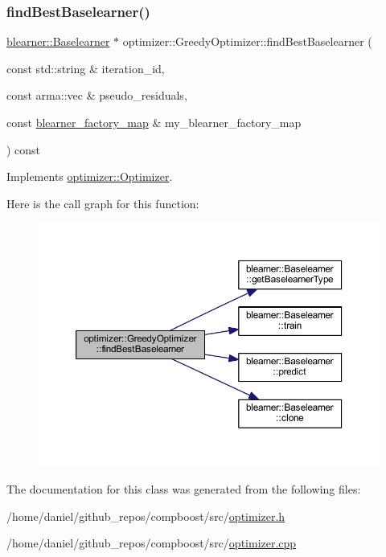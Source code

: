 \subsubsection{\texorpdfstring{find\+Best\+Baselearner()}{findBestBaselearner()}}
{\footnotesize\ttfamily \hyperlink{classblearner_1_1_baselearner}{blearner\+::\+Baselearner} $\ast$ optimizer\+::\+Greedy\+Optimizer\+::find\+Best\+Baselearner (\begin{DoxyParamCaption}\item[{const std\+::string \&}]{iteration\+\_\+id,  }\item[{const arma\+::vec \&}]{pseudo\+\_\+residuals,  }\item[{const \hyperlink{baselearner__factory__list_8h_a058570e00ae11b882cfed36eb40be025}{blearner\+\_\+factory\+\_\+map} \&}]{my\+\_\+blearner\+\_\+factory\+\_\+map }\end{DoxyParamCaption}) const\hspace{0.3cm}{\ttfamily [virtual]}}



Implements \hyperlink{classoptimizer_1_1_optimizer_a134c7b34ed868231fbab53e9ebfa8fd8}{optimizer\+::\+Optimizer}.

Here is the call graph for this function\+:\nopagebreak
\begin{figure}[H]
\begin{center}
\leavevmode
\includegraphics[width=350pt]{classoptimizer_1_1_greedy_optimizer_adc36d8a0082dc065fc1340869d36069d_cgraph}
\end{center}
\end{figure}


The documentation for this class was generated from the following files\+:\begin{DoxyCompactItemize}
\item 
/home/daniel/github\+\_\+repos/compboost/src/\hyperlink{optimizer_8h}{optimizer.\+h}\item 
/home/daniel/github\+\_\+repos/compboost/src/\hyperlink{optimizer_8cpp}{optimizer.\+cpp}\end{DoxyCompactItemize}
